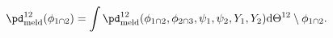 \begin{equation}
  \pd_{\text{meld}}^{12}(\phi_{1 \cap 2}) = 
  \int
    \pd_{\text{meld}}^{12}(\phi_{1 \cap 2}, \phi_{2 \cap 3}, \psi_{1}, \psi_{2}, Y_{1}, Y_{2})
  \text{d} \Theta^{12} \setminus \phi_{1 \cap 2}.
  \label{eqn:example-melded-marginal-definition}
\end{equation}